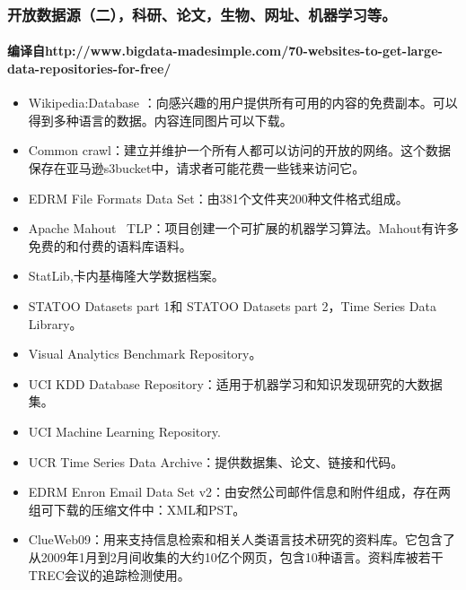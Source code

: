 \documentclass[letterpaper,10pt,english]{sphinxmanual}
\begin{document}
\subsubsection{开放数据源（二），科研、论文，生物、网址、机器学习等。}
\label{opendatasource:}\label{opendatasource:id3}

\paragraph{编译自http://www.bigdata-madesimple.com/70-websites-to-get-large-data-repositories-for-free/}
\label{opendatasource:http-www-bigdata-madesimple-com-70-websites-to-get-large-data-repositories-for-free}\begin{itemize}
\item {} 
Wikipedia:Database ：向感兴趣的用户提供所有可用的内容的免费副本。可以得到多种语言的数据。内容连同图片可以下载。

\item {} 
Common crawl：建立并维护一个所有人都可以访问的开放的网络。这个数据保存在亚马逊s3bucket中，请求者可能花费一些钱来访问它。

\item {} 
EDRM File Formats Data Set：由381个文件夹200种文件格式组成。

\item {} 
Apache Mahout  TLP：项目创建一个可扩展的机器学习算法。Mahout有许多免费的和付费的语料库语料。

\item {} 
StatLib,卡内基梅隆大学数据档案。

\item {} 
STATOO Datasets part 1和 STATOO Datasets part 2，Time Series Data Library。

\item {} 
Visual Analytics Benchmark Repository。

\item {} 
UCI KDD Database Repository：适用于机器学习和知识发现研究的大数据集。

\item {} 
UCI Machine Learning Repository.

\item {} 
UCR Time Series Data Archive：提供数据集、论文、链接和代码。

\item {} 
EDRM Enron Email Data Set v2：由安然公司邮件信息和附件组成，存在两组可下载的压缩文件中：XML和PST。

\item {} 
ClueWeb09：用来支持信息检索和相关人类语言技术研究的资料库。它包含了从2009年1月到2月间收集的大约10亿个网页，包含10种语言。资料库被若干TREC会议的追踪检测使用。


\end{itemize}
\end{document}
